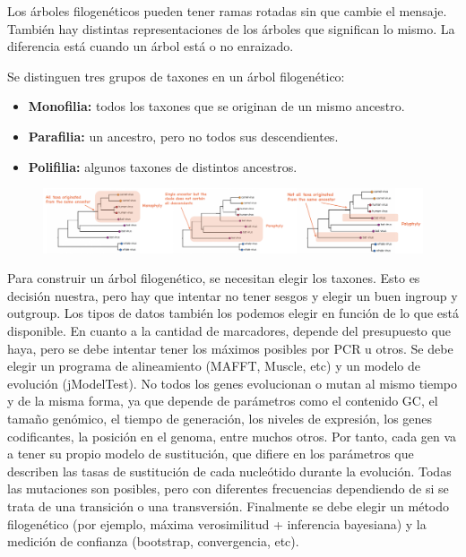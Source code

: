 Los árboles filogenéticos pueden tener ramas rotadas sin que cambie el mensaje. También hay distintas representaciones de los árboles que significan lo mismo. La diferencia está cuando un árbol está o no enraizado.

Se distinguen tres grupos de taxones en un árbol filogenético:
\begin{itemize}
\item \textbf{Monofilia:} todos los taxones que se originan de un mismo ancestro.
\item \textbf{Parafilia:} un ancestro, pero no todos sus descendientes.
\item \textbf{Polifilia:} algunos taxones de distintos ancestros.
\end{itemize}

\begin{figure}[htbp]
\centering
\includegraphics[width=\linewidth]{figs/tree-groups.png}
\end{figure}

Para construir un árbol filogenético, se necesitan elegir los taxones. Esto es decisión nuestra, pero hay que intentar no tener sesgos y elegir un buen ingroup y outgroup. Los tipos de datos también los podemos elegir en función de lo que está disponible. En cuanto a la cantidad de marcadores, depende del presupuesto que haya, pero se debe intentar tener los máximos posibles por PCR u otros. Se debe elegir un programa de alineamiento (MAFFT, Muscle, etc) y un modelo de evolución (jModelTest). No todos los genes evolucionan o mutan al mismo tiempo y de la misma forma, ya que depende de parámetros como el contenido GC, el tamaño genómico, el tiempo de generación, los niveles de expresión, los genes codificantes, la posición en el genoma, entre muchos otros. Por tanto, cada gen va a tener su propio modelo de sustitución, que difiere en los parámetros que describen las tasas de sustitución de cada nucleótido durante la evolución. Todas las mutaciones son posibles, pero con diferentes frecuencias dependiendo de si se trata de una transición o una transversión. Finalmente se debe elegir un método filogenético (por ejemplo, máxima verosimilitud + inferencia bayesiana) y la medición de confianza (bootstrap, convergencia, etc). 


